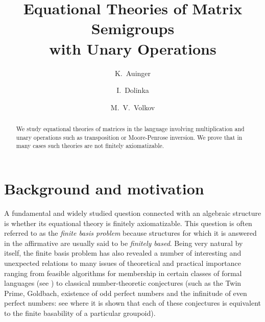 \documentclass[11pt,reqno]{amsart}
\title[Matrix Semigroups with Unary Operations]{Equational Theories of Matrix Semigroups\\ with Unary Operations}
\author{K.~Auinger}
\author{I.~Dolinka}
\author {M.~V.~Volkov}
\numberwithin{equation}{section}
\theoremstyle{remark}
\begin{document}
\begin{abstract}
We study equational theories of matrices in the language involving multiplication and unary operations such as
transposition or Moore-Penrose inversion. We prove that in many cases such theories are not finitely axiomatizable.
\end{abstract}

\maketitle

\section{Background and motivation}
A fundamental and widely studied question connected with an algebraic structure is whether its equational theory is
finitely axiomatizable. This question is often referred to as the \emph{finite basis problem} because structures for
which it is answered in the affirmative are usually said to be \emph{finitely based}. Being very natural by itself, the
finite basis problem has also revealed a number of interesting and unexpected relations to many issues of theoretical
and practical importance ranging from feasible algorithms for membership in certain classes of formal languages (see
\cite{Alm95}) to classical number-theoretic conjectures (such as the Twin Prime, Goldbach, existence of odd perfect
numbers and the infinitude of even perfect numbers: see \cite{Per89} where it is shown that each of these conjectures
is equivalent to the finite basability of a particular groupoid).
\end{document}
